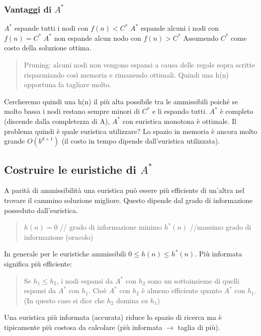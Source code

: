 \documentclass{article}
\begin{document}
\subsubsection{Vantaggi di $A^*$}
$A^*$ espande tutti i nodi con $f(n) < C^*$ \newline
$A^*$ espande alcuni i nodi con $f(n) = C^*$ \newline
$A^*$ non espande alcun nodo con $f(n) > C^*$ \newline
Assumendo $C^*$ come costo della soluzione ottima.
\begin{quote}
    Pruning: alcuni nodi non vengono espansi a causa delle regole sopra scritte risparmiando così memoria e rimanendo ottimali. Quindi una h(n) opportuna fa tagliare molto.
\end{quote}
Cercheremo quindi una h(n) il più alta possibile tra le ammissibili poiché se molto bassa i nodi restano sempre minori di $C^*$ e li espando tutti. \newline
$A^*$ è completo (discende dalla completezza di A), $A^*$ con euristica monotona è ottimale. Il problema quindi è quale euristica utilizzare? Lo spazio in memoria è ancora molto grande $O(b^{d+1})$ (il costo in tempo dipende dall'euristica utilizzata). 

\subsection{Costruire le euristiche di $A^*$}
A parità di ammissibilità una euristica può essere più efficiente di un'altra nel trovare il cammino soluzione migliore. Questo dipende dal grado di informazione posseduto dall'euristica.
\begin{quote}
    $h(n) = 0$ // grado di informazione minimo \newline
    $h^*(n)$ //massimo grado di informazione (oracolo)
\end{quote}
In generale per le euristiche ammissibili $0 \leq h(n) \leq h^*(n)$. \newline
Più informata significa più efficiente:
\begin{quote}
    Se $h_1 \leq h_2$, i nodi espansi da $A^*$ con $h_2$ sono un sottoinsieme di quelli espansi da $A^*$ con $h_1$. Cioè $A^*$ con $h_2$ è almeno efficiente quanto $A^*$ con $h_1$. (In questo caso si dice che $h_2$ domina su $h_1$)
\end{quote}
Una euristica più informata (accurata) riduce lo spazio di ricerca ma è tipicamente più costosa da calcolare (più informata $\rightarrow$ taglia di più). 
\end{document}
